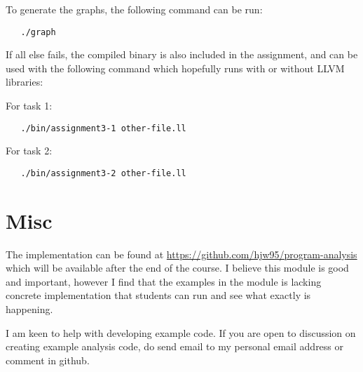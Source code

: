 \documentclass[11pt,a4paper,fleqn]{article}
\begin{document}
To generate the graphs, the following command can be run:

\begin{verbatim}
   ./graph
\end{verbatim}

If all else fails, the compiled binary is also included in the assignment, and can be used with the following command which hopefully runs with or without LLVM libraries:

For task 1:
\begin{verbatim}
   ./bin/assignment3-1 other-file.ll
\end{verbatim}

For task 2:
\begin{verbatim}
   ./bin/assignment3-2 other-file.ll
\end{verbatim}

\section {Misc}

The implementation can be found at \url{https://github.com/hjw95/program-analysis} which will be available after the end of the course.
I believe this module is good and important, however I find that the examples in the module is lacking concrete implementation that students can run and see what exactly is happening.

I am keen to help with developing example code. If you are open to discussion on creating example analysis code, do send email to my personal email address or comment in github.
\end{document}
